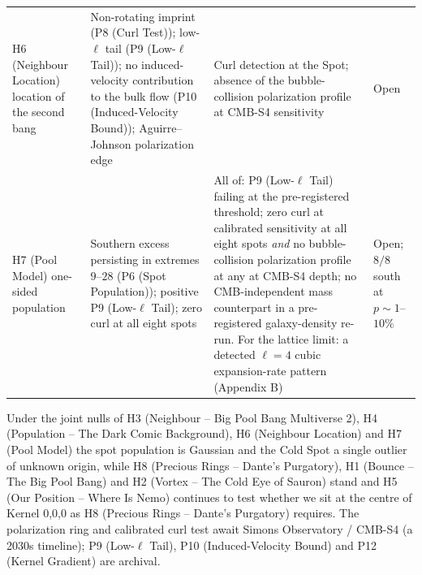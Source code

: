 \documentclass[
  11pt,
]{article}
\begin{document}
\begin{longtable}[]{@{}llll@{}}
\begin{minipage}[t]{0.22\columnwidth}\raggedright
H6 (Neighbour Location) location of the second bang\strut
\end{minipage} & \begin{minipage}[t]{0.22\columnwidth}\raggedright
Non-rotating imprint (P8 (Curl Test)); low-\(\ell\) tail (P9
(Low-\(\ell\) Tail)); no induced-velocity contribution to the bulk flow
(P10 (Induced-Velocity Bound)); Aguirre--Johnson polarization edge\strut
\end{minipage} & \begin{minipage}[t]{0.22\columnwidth}\raggedright
Curl detection at the Spot; absence of the bubble-collision polarization
profile at CMB-S4 sensitivity\strut
\end{minipage} & \begin{minipage}[t]{0.22\columnwidth}\raggedright
Open\strut
\end{minipage}\tabularnewline
\begin{minipage}[t]{0.22\columnwidth}\raggedright
H7 (Pool Model) one-sided population\strut
\end{minipage} & \begin{minipage}[t]{0.22\columnwidth}\raggedright
Southern excess persisting in extremes \(9\)--\(28\) (P6 (Spot
Population)); positive P9 (Low-\(\ell\) Tail); zero curl at all eight
spots\strut
\end{minipage} & \begin{minipage}[t]{0.22\columnwidth}\raggedright
All of: P9 (Low-\(\ell\) Tail) failing at the pre-registered threshold;
zero curl at calibrated sensitivity at all eight spots \emph{and} no
bubble-collision polarization profile at any at CMB-S4 depth; no
CMB-independent mass counterpart in a pre-registered galaxy-density
re-run. For the lattice limit: a detected \(\ell=4\) cubic
expansion-rate pattern (Appendix B)\strut
\end{minipage} & \begin{minipage}[t]{0.22\columnwidth}\raggedright
Open; \(8/8\) south at \(p \sim 1\)--\(10\%\)\strut
\end{minipage}\tabularnewline
\bottomrule
\end{longtable}

Under the joint nulls of H3 (Neighbour -- Big Pool Bang Multiverse 2),
H4 (Population -- The Dark Comic Background), H6 (Neighbour Location)
and H7 (Pool Model) the spot population is Gaussian and the Cold Spot a
single outlier of unknown origin, while H8 (Precious Rings -- Dante's
Purgatory), H1 (Bounce -- The Big Pool Bang) and H2 (Vortex -- The Cold
Eye of Sauron) stand and H5 (Our Position -- Where Is Nemo) continues to
test whether we sit at the centre of Kernel 0,0,0 as H8 (Precious Rings
-- Dante's Purgatory) requires. The polarization ring and calibrated
curl test await Simons Observatory / CMB-S4 (a 2030s timeline); P9
(Low-\(\ell\) Tail), P10 (Induced-Velocity Bound) and P12 (Kernel
Gradient) are archival.
\end{document}
